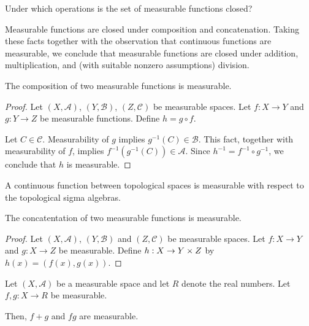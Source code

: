 
\sbasic





















\sstart
{}


Under which operations is
the set of measurable
functions closed?


Measurable functions are closed
under composition and concatenation.
Taking these facts
together with the observation
that continuous functions
are measurable, we conclude
that measurable
functions are closed under
addition, multiplication,
and (with suitable nonzero
assumptions) division.


\begin{prop}
The composition of two
measurable functions
is measurable.
\begin{proof}
Let
$(X, \mathcal{A})$,
$(Y, \mathcal{B})$,
$(Z, \mathcal{C})$
be measurable spaces.
Let $f: X \to Y$
and $g: Y \to Z$ be
measurable functions.
Define $h = g \circ f$.

Let $C \in \mathcal{C}$.
Measurability of $g$
implies
$g^{-1}(C) \in \mathcal{B}$.
This fact, together with
measurability of $f$,
implies
$f^{-1}(g^{-1}(C)) \in \mathcal{A}$.
Since $h^{-1} = f^{-1} \circ g^{-1}$,
we conclude that
$h$ is measurable.
\end{proof}
\end{prop}

\begin{prop}
  A continuous function
  between topological
  spaces
  is measurable with
  respect to the
  topological sigma algebras.
\end{prop}

\begin{prop}
  The concatentation of
  two measurable functions
  is measurable.
  \begin{proof}
Let
$(X, \mathcal{A})$,
$(Y, \mathcal{B})$
and
$(Z, \mathcal{C})$
be measurable spaces.
Let
$f: X \to Y$
and
$g: X \to Z$
be measurable.
Define
$h: X \to Y \times Z$
by $h(x) = (f(x), g(x))$.
  \end{proof}
\end{prop}

\begin{prop}
Let $(X, \mathcal{A})$
be a measurable space
and let $R$ denote the
real numbers.
Let
$f,g: X \to R$
be measurable.

Then, $f+g$ and $fg$ are measurable.
\end{prop}
\strats
